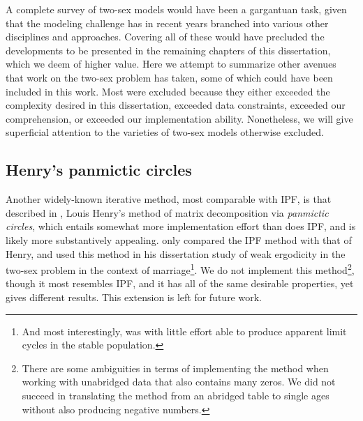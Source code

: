 \label{sec:other}
A complete survey of two-sex models would have been a gargantuan task, given
that the modeling challenge has in recent years branched into various other
disciplines and approaches. Covering all of these would have precluded the
developments to be presented in the remaining chapters of this dissertation,
which we deem of higher value. Here we attempt to summarize other avenues that
work on the two-sex problem has taken, some of which could have been included in this work. Most were excluded because they either exceeded the
complexity desired in this dissertation, exceeded data constraints, exceeded our
comprehension, or exceeded our implementation ability. Nonetheless, we will give
superficial attention to the varieties of two-sex models otherwise excluded.

\subsection{Henry's panmictic circles} 
Another widely-known iterative method, 
most comparable with IPF, is that described in \citet{henry1972nuptiality},
Louis Henry's method of matrix decomposition via \textit{panmictic circles}, which entails somewhat more
implementation effort than does IPF, and is likely more substantively appealing. 
\citet{mc1975models} only compared the
IPF method with that of Henry, and \citet{wijewickrema1980weak} used this method 
in his dissertation study of weak ergodicity in the two-sex problem in the
context of marriage\footnote{And most interestingly, was with little
effort able to produce apparent limit cycles in the stable population.}. We do
not implement this method\footnote{There are some ambiguities in terms of 
implementing the method when working with unabridged data that also contains 
many zeros. We did not succeed in translating the method from an
abridged table to single ages without also producing negative numbers.}, though
it most resembles IPF, and it has all of the same desirable properties, yet
gives different results. This extension is left for future work.


